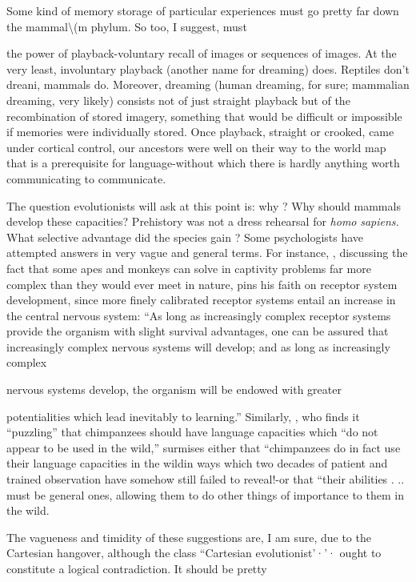 Some kind of memory storage of particular experiences must go pretty far down the mammal{\textbackslash}(m phylum. So too, I suggest, must


the power of playback-voluntary recall of images or sequences of images. At the very least, involuntary playback (another name for dreaming) does. Reptiles don't dreani, mammals do. Moreover, dream\-ing (human dreaming, for sure; mammalian dreaming, very likely) consists not of just straight playback but of the recombination of stored imagery, something that would be difficult or impossible if memories were individually stored. Once playback, straight or crooked, came under cortical control, our ancestors were well on their way to the world map that is a prerequisite for language-without which there is hardly anything worth communicating to communicate.

The question evolutionists will ask at this point is: why ? Why should mammals develop these capacities? Prehistory was not a dress rehearsal for \textit{homo} \textit{sapiens.} What selective advantage did the species gain ? Some psychologists have attempted answers in very vague and general terms. For instance, \citet{Harlow1958}, discussing the fact that some apes and monkeys can solve in captivity problems far more complex than they would ever meet in nature, pins his faith on receptor system development, since more finely calibrated receptor systems entail an increase in the central nervous system: ``As long as increas\-ingly complex receptor systems provide the organism with slight survival advantages, one can be assured that increasingly complex nervous systems will develop; and as long as increasingly complex

nervous systems develop, the organism will be endowed with greater

potentialities which lead inevitably to learning.'' Similarly, \citet{Passingham1979}, who finds it ``puzzling'' that chimpanzees should have language capacities which ``do not appear to be used in the wild,'' surmises either that ``chimpanzees do in fact use their language capacities in the wild{\textquotedbl}\-in ways which two decades of patient and trained observation have somehow still failed to reveal!{}-or that ``their abilities . .. must be general ones, allowing them to do other things of importance to them in the wild.{\textquotedbl}

The vagueness and timidity of these suggestions are, I am sure, due to the Cartesian hangover, although the class ``Cartesian evolution\-ist'·'· ought to constitute a logical contradiction. It should be pretty

